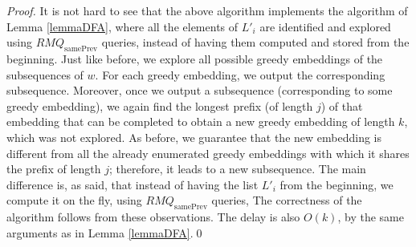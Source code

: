 \documentclass[runningheads,UKenglish,cleveref, autoref, thm-restate]{llncs}
\DeclareMathOperator{\prevArray}{samePrev}
\begin{document}
\begin{proof}
It is not hard to see that the above algorithm implements the algorithm of Lemma \ref{lemmaDFA}, where all the elements of $L'_i$ are identified and explored using $RMQ_{\prevArray}$ queries, instead of having them computed and stored from the beginning. Just like before, we explore all possible greedy embeddings of the subsequences of $w$. For each greedy embedding, we output the corresponding subsequence. Moreover, once we output a subsequence (corresponding to some greedy embedding), we again find the longest prefix (of length $j$) of that embedding that can be completed to obtain a new greedy embedding of length $k$, which was not explored. As before, we guarantee that the new embedding is different from all the already enumerated greedy embeddings with which it shares the prefix of length $j$; therefore, it leads to a new subsequence. The main difference is, as said, that instead of having the list $L'_i$ from the beginning, we compute it on the fly, using $RMQ_{\prevArray}$ queries,
The correctness of the algorithm follows from these observations. The delay is also $O(k)$, by the same arguments as in Lemma \ref{lemmaDFA}.\qed
\end{proof}
\end{document}
